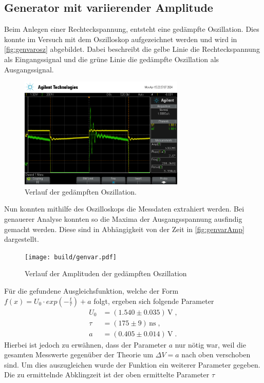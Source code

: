 \subsection{Generator mit variierender Amplitude}
Beim Anlegen einer Rechteckspannung, entsteht eine gedämpfte Oszillation. Dies konnte im Versuch mit dem Oszilloskop aufgezeichnet werden und 
wird  in \autoref{fig:genvarosz} abgebildet. Dabei beschreibt die gelbe Linie die Rechteckspannung als Eingangssignal und die grüne Linie 
die gedämpfte Oszillation als Ausgangssignal.
\begin{figure}
    \centering
    \includegraphics[width=0.7\textwidth]{genvarplot.png}
    \caption{Verlauf der gedämpften Oszillation.}
    \label{fig:genvarosz}
\end{figure}
Nun konnten mithilfe des Oszilloskops die Messdaten extrahiert werden. Bei genauerer Analyse konnten so die Maxima der Ausgangsspannung 
ausfindig gemacht werden. Diese sind in Abhängigkeit von der Zeit in \autoref{fig:genvarAmp} dargestellt.
\begin{figure}
    \centering
    \texttt{[image: build/genvar.pdf]}
    \caption{Verlauf der Amplituden der gedämpften Oszillation}
    \label{fig:genvarAmp}
\end{figure}
Für die gefundene Ausgleichsfunktion, welche der Form $f(x)= U_0\cdot exp(-\frac{t}{\tau})+a$ folgt, ergeben sich folgende Parameter
\begin{align*}
    U_0&= (1.540\pm 0.035) \, \unit{\volt}\;,\\
    \tau&= (175\pm 9)\, \unit{\nano \second}\;,\\
    a&= (0.405\pm 0.014) \, \unit{\volt}\; .
\end{align*}
Hierbei ist jedoch zu erwähnen, dass der Parameter $a$ nur nötig war, weil die gesamten Messwerte gegenüber der Theorie um $\Delta V= a$ nach oben verschoben sind.
Um dies auszugleichen wurde der Funktion ein weiterer Parameter gegeben.
Die zu ermittelnde Abklingzeit ist der oben ermittelte Parameter $\tau$ 